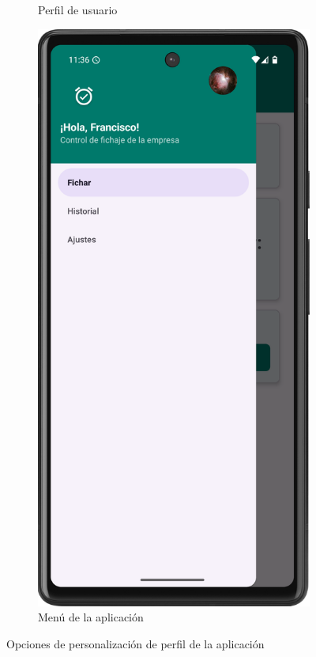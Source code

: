 \begin{figure}[H]
\begin{subfigure}[b]{0.4\textwidth}
         \caption{Perfil de usuario}
         \label{fig:perfil}
     \end{subfigure}
     \hfill
     \begin{subfigure}[b]{0.4\textwidth}
         \centering
         \includegraphics[width=\textwidth]{root/menu.png}
         \caption{Menú de la aplicación}
         \label{fig:menu}
     \end{subfigure}
        \caption{Opciones de personalización de perfil de la aplicación}
        \label{fig:perfiles}
\end{figure}
